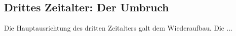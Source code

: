 \subsection{Drittes Zeitalter: Der Umbruch}
\par Die Hauptausrichtung des dritten Zeitalters galt dem Wiederaufbau. Die ...

